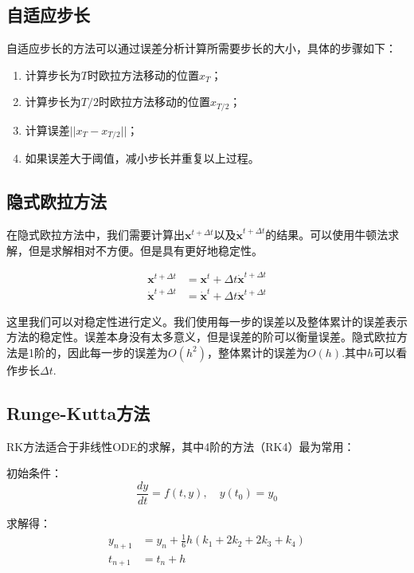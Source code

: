 \documentclass[openany]{progbookcn}
\begin{document}
\subsection{自适应步长}

自适应步长的方法可以通过误差分析计算所需要步长的大小，具体的步骤如下：

\begin{enumerate}
	\item 计算步长为$T$时欧拉方法移动的位置$x_T$；
	\item 计算步长为$T/2$时欧拉方法移动的位置$x_{T/2}$；
	\item 计算误差$||x_T-x_{T/2}||$；
	\item 如果误差大于阈值，减小步长并重复以上过程。
\end{enumerate}

\subsection{隐式欧拉方法}

在隐式欧拉方法中，我们需要计算出$\mathbf{x}^{t+\Delta t}$以及$\dot{\mathbf{x}}^{t+\Delta t} $的结果。可以使用牛顿法求解，但是求解相对不方便。但是具有更好地稳定性。

\begin{equation}
	\begin{split}
		\mathbf{x}^{t+\Delta t} &=\mathbf{x}^{t}+\Delta t \dot{\mathbf{x}}^{t+\Delta t} \\
		\dot{\mathbf{x}}^{t+\Delta t} &=\dot{\mathbf{x}}^{t}+\Delta t \ddot{\mathbf{x}}^{t+\Delta t}
	\end{split}
\end{equation}

这里我们可以对稳定性进行定义。我们使用每一步的误差以及整体累计的误差表示方法的稳定性。误差本身没有太多意义，但是误差的阶可以衡量误差。隐式欧拉方法是1阶的，因此每一步的误差为$O(h^2)$，整体累计的误差为$O(h)$.其中$h$可以看作步长$\Delta t$.

\subsection{Runge-Kutta方法}

RK方法适合于非线性ODE的求解，其中4阶的方法（RK4）最为常用：

初始条件：
\begin{equation}
	\frac{d y}{d t}=f(t, y), \quad y\left(t_{0}\right)=y_{0}
\end{equation}

求解得：
\begin{equation}
	\begin{split}
		y_{n+1}&=y_{n}+\frac{1}{6} h\left(k_{1}+2 k_{2}+2 k_{3}+k_{4}\right) \\
		t_{n+1}&=t_{n}+h
	\end{split}
\end{equation}
\end{document}

